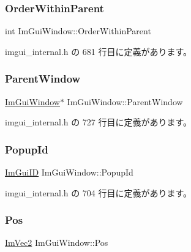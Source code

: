\subsubsection{\texorpdfstring{Order\+Within\+Parent}{OrderWithinParent}}
{\footnotesize\ttfamily int Im\+Gui\+Window\+::\+Order\+Within\+Parent}



 imgui\+\_\+internal.\+h の 681 行目に定義があります。

\mbox{\label{struct_im_gui_window_a5f0b37cb12fbeb3efe00d0cd826d5d65}} 
\subsubsection{\texorpdfstring{Parent\+Window}{ParentWindow}}
{\footnotesize\ttfamily \mbox{\hyperlink{struct_im_gui_window}{Im\+Gui\+Window}}$\ast$ Im\+Gui\+Window\+::\+Parent\+Window}



 imgui\+\_\+internal.\+h の 727 行目に定義があります。

\mbox{\label{struct_im_gui_window_a319c5f43fa4ee9c76b8a6e551e0c0869}} 
\subsubsection{\texorpdfstring{Popup\+Id}{PopupId}}
{\footnotesize\ttfamily \mbox{\hyperlink{imgui_8h_a1785c9b6f4e16406764a85f32582236f}{Im\+Gui\+ID}} Im\+Gui\+Window\+::\+Popup\+Id}



 imgui\+\_\+internal.\+h の 704 行目に定義があります。

\mbox{\label{struct_im_gui_window_a1453f685401a44f76256fb54a4aac451}} 
\subsubsection{\texorpdfstring{Pos}{Pos}}
{\footnotesize\ttfamily \mbox{\hyperlink{struct_im_vec2}{Im\+Vec2}} Im\+Gui\+Window\+::\+Pos}



